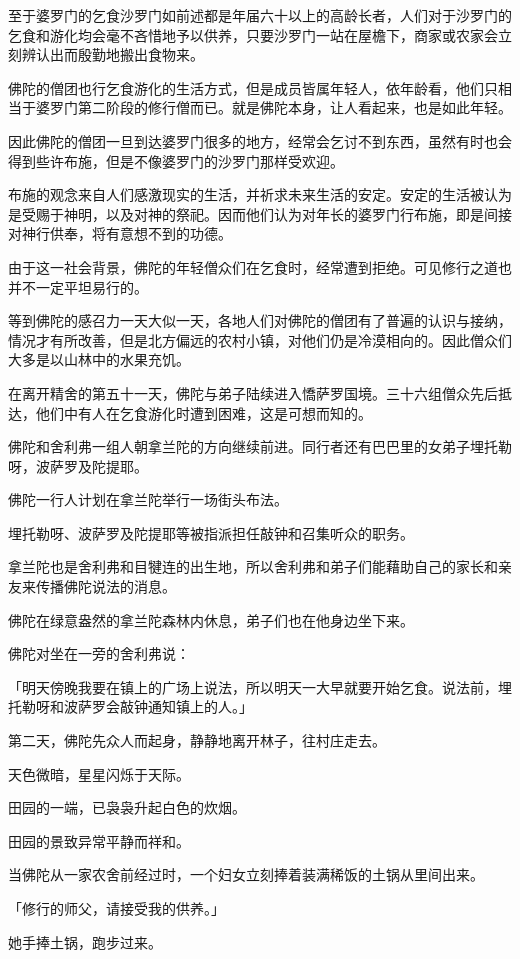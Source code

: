 \documentclass[twoside,openany]{book}
\begin{document}
至于婆罗门的乞食沙罗门如前述都是年届六十以上的高龄长者，人们对于沙罗门的乞食和游化均会毫不吝惜地予以供养，只要沙罗门一站在屋檐下，商家或农家会立刻辨认出而殷勤地搬出食物来。

佛陀的僧团也行乞食游化的生活方式，但是成员皆属年轻人，依年龄看，他们只相当于婆罗门第二阶段的修行僧而已。就是佛陀本身，让人看起来，也是如此年轻。

因此佛陀的僧团一旦到达婆罗门很多的地方，经常会乞讨不到东西，虽然有时也会得到些许布施，但是不像婆罗门的沙罗门那样受欢迎。

布施的观念来自人们感激现实的生活，并祈求未来生活的安定。安定的生活被认为是受赐于神明，以及对神的祭祀。因而他们认为对年长的婆罗门行布施，即是间接对神行供奉，将有意想不到的功德。

由于这一社会背景，佛陀的年轻僧众们在乞食时，经常遭到拒绝。可见修行之道也并不一定平坦易行的。

等到佛陀的感召力一天大似一天，各地人们对佛陀的僧团有了普遍的认识与接纳，情况才有所改善，但是北方偏远的农村小镇，对他们仍是冷漠相向的。因此僧众们大多是以山林中的水果充饥。

在离开精舍的第五十一天，佛陀与弟子陆续进入憍萨罗国境。三十六组僧众先后抵达，他们中有人在乞食游化时遭到困难，这是可想而知的。

佛陀和舍利弗一组人朝拿兰陀的方向继续前进。同行者还有巴巴里的女弟子埋托勒呀，波萨罗及陀提耶。

佛陀一行人计划在拿兰陀举行一场街头布法。

埋托勒呀、波萨罗及陀提耶等被指派担任敲钟和召集听众的职务。

拿兰陀也是舍利弗和目犍连的出生地，所以舍利弗和弟子们能藉助自己的家长和亲友来传播佛陀说法的消息。

佛陀在绿意盎然的拿兰陀森林内休息，弟子们也在他身边坐下来。

佛陀对坐在一旁的舍利弗说：

「明天傍晚我要在镇上的广场上说法，所以明天一大早就要开始乞食。说法前，埋托勒呀和波萨罗会敲钟通知镇上的人。」

第二天，佛陀先众人而起身，静静地离开林子，往村庄走去。

天色微暗，星星闪烁于天际。

田园的一端，已袅袅升起白色的炊烟。

田园的景致异常平静而祥和。

当佛陀从一家农舍前经过时，一个妇女立刻捧着装满稀饭的土锅从里间出来。

「修行的师父，请接受我的供养。」

她手捧土锅，跑步过来。
\end{document}
